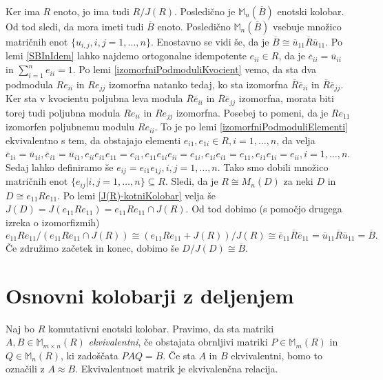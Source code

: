 \documentclass[a4paper, 12pt]{amsart}
\theoremstyle{definition} %
\theoremstyle{plain} %
\newcommand{\M}{\mathbb M}
\begin{document}
\proof
Ker ima $R$ enoto, jo ima tudi $R/J(R)$. Posledično je $\M_n(\overline{B})$ enotski kolobar. Od tod sledi, da mora imeti tudi $\overline{B}$ enoto. Posledično $\M_n(\overline{B})$ vsebuje množico matričnih enot $\{u_{i,j}, i,j=1,\dots,n\}$. Enostavno se vidi še, da je $\overline{B}\cong \overline{u}_{11}\overline{R} \overline{u}_{11} $. Po lemi \ref{SBInIdem} lahko najdemo ortogonalne idempotente $e_{ii} \in R$, da je $\overline{e}_{ii} = \overline{u}_{ii}$ in $\sum_{i=1}^n e_{ii} = 1$. Po lemi \ref{izomorfniPodmoduliKvocient} vemo, da sta dva podmodula $Re_{ii}$ in $Re_{jj}$ izomorfna natanko tedaj, ko sta izomorfna $\overline{R} \overline{e}_{ii}$ in $\overline{R}\overline{e}_{jj}$. Ker sta v kvocientu poljubna leva modula $\overline{R} \overline{e}_{ii}$ in $\overline{R}\overline{e}_{jj}$ izomorfna, morata biti torej tudi poljubna modula $Re_{ii}$ in $Re_{jj}$ izomorfna. Posebej to pomeni, da je $Re_{11}$ izomorfen poljubnemu modulu $Re_{ii}$. To je po lemi \ref{izomorfniPodmoduliElementi} ekvivalentno s tem, da obstajajo elementi $e_{i1}, e_{1i}\in R, i=1,\dots,n$, da velja $\overline{e}_{1i} = \overline{u}_{1i}, \overline{e}_{i1} = \overline{u}_{i1}, e_{ii}e_{i1}e_{11} = e_{i1}, e_{11} e_{1i}e_{ii} = e_{1i}, e_{1i} e_{i1} = e_{11}, e_{i1} e_{1i} = e_{ii}, i = 1,\dots,n$. Sedaj lahko definiramo še $e_{ij} = e_{i1}e_{1j}, i, j = 1,\dots,n$. Tako smo dobili množico matričnih enot $\{ e_{ij}|i,j=1,\dots,n\} \subseteq R$. Sledi, da je $R\cong M_n(D)$ za neki $D$ in $D\cong e_{11} R e_{11}$. Po lemi \ref{J(R)-kotniKolobar} velja še $J(D) = J(e_{11} R e_{11}) = e_{11} R e_{11} \cap J(R)$. Od tod dobimo (s pomočjo drugega izreka o izomorfizmih)
$$
e_{11}Re_{11} / (e_{11} R e_{11} \cap J(R)) \cong (e_{11} R e_{11} + J(R))/J(R) \cong \overline{e}_{11} \overline{R} \overline{e}_{11} = \overline{u}_{11} \overline{R} \overline{u}_{11} = \overline{B}.
$$
Če združimo začetek in konec, dobimo še $D/J(D) \cong \overline{B}$.
\endproof

\section{Osnovni kolobarji z deljenjem}

Naj bo $R$ komutativni enotski kolobar. Pravimo, da sta matriki $A,B\in \M_{m\times n} (R)$ \emph{ekvivalentni}, če obstajata obrnljivi matriki $P\in \M_m(R)$ in $Q\in \M_n(R)$, ki zadoščata $PAQ = B$. Če sta $A$ in $B$ ekvivalentni, bomo to označili z $A \approx B$. Ekvivalentnost matrik je ekvivalenčna relacija.
\end{document}
